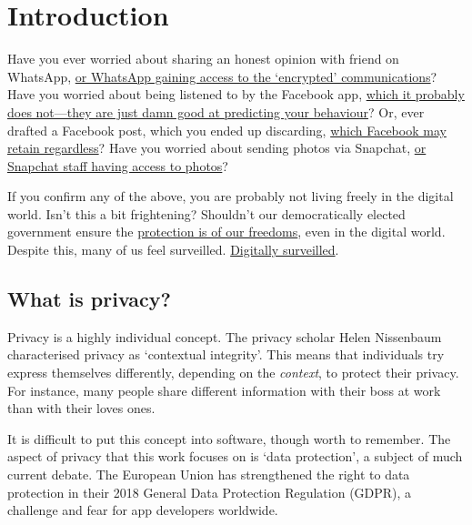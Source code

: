 \documentclass[
]{book}
\begin{document}
\hypertarget{intro}{%
\chapter{Introduction}\label{intro}}

Have you ever worried about sharing an honest opinion with friend on WhatsApp, \href{https://www.wired.com/story/whatsapp-security-flaws-encryption-group-chats/}{or WhatsApp gaining access to the `encrypted' communications}? Have you worried about being listened to by the Facebook app, \href{https://www.newstatesman.com/science-tech/social-media/2018/03/testing-facebook-listens-your-conversations-adverts}{which it probably does not---they are just damn good at predicting your behaviour}? Or, ever drafted a Facebook post, which you ended up discarding, \href{https://slate.com/technology/2013/12/facebook-self-censorship-what-happens-to-the-posts-you-dont-publish.html}{which Facebook may retain regardless}? Have you worried about sending photos via Snapchat, \href{https://www.vice.com/en_us/article/xwnva7/snapchat-employees-abused-data-access-spy-on-users-snaplion}{or Snapchat staff having access to photos}?

If you confirm any of the above, you are probably not living freely in the digital world. Isn't this a bit frightening? Shouldn't our democratically elected government ensure the \href{https://oll.libertyfund.org/quotes/497}{protection is of our freedoms}, even in the digital world. Despite this, many of us feel surveilled. \href{https://www.theguardian.com/books/2019/feb/02/age-of-surveillance-capitalism-shoshana-zuboff-review}{Digitally surveilled}.

\hypertarget{what-is-privacy}{%
\section{What is privacy?}\label{what-is-privacy}}

Privacy is a highly individual concept. The privacy scholar Helen Nissenbaum characterised privacy as `contextual integrity'. This means that individuals try express themselves differently, depending on the \emph{context}, to protect their privacy. For instance, many people share different information with their boss at work than with their loves ones.

It is difficult to put this concept into software, though worth to remember. The aspect of privacy that this work focuses on is `data protection', a subject of much current debate. The European Union has strengthened the right to data protection in their 2018 General Data Protection Regulation (GDPR), a challenge and fear for app developers worldwide.
\end{document}
